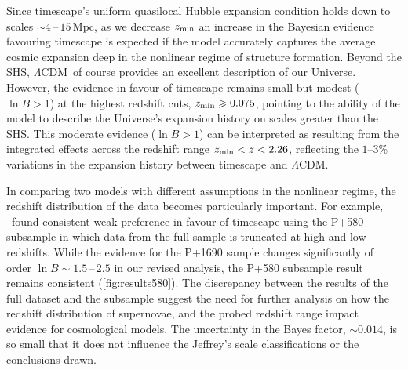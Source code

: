 \documentclass[fleqn,usenatbib]{mnras}
\newcommand{\LA}{\Lambda}
\newcommand{\LCDM}{$\LA$CDM}
\newcommand{\laneetal}{\citet{Lane_2023}}
\newcommand{\goesas}{\mathop{\sim}\limits}
\newcommand{\ns}[1]{_{\rm #1}}
\newcommand{\zmin}{z\ns{min}}
\begin{document}
Since timescape's uniform quasilocal Hubble expansion condition holds down to scales $\goesas4\,$--$\,15\,$Mpc, as we decrease $\zmin$ an increase in the Bayesian evidence favouring timescape is expected if the model accurately captures the average cosmic expansion deep in the nonlinear regime of structure formation. Beyond the SHS, \LCDM\ of course provides an excellent description of our Universe. However, the evidence in favour of timescape remains small but modest ($\ln B > 1$) at the highest redshift cuts, $\zmin \geq 0.075$, pointing to the ability of the model to describe the Universe's expansion history on scales greater than the SHS. This moderate evidence ($\ln B > 1$) can be interpreted as resulting from the integrated effects across the redshift range $\zmin<z<2.26$, reflecting the $1$--$3$\% variations in the expansion history between timescape and \LCDM.

In comparing two models with different assumptions in the nonlinear regime, the redshift distribution of the data becomes particularly important. For example, \laneetal\ found consistent weak preference in favour of timescape using the P+580 subsample in which data from the full sample is truncated at high and low redshifts. While the evidence for the P+1690 sample changes significantly of order $\ln B \sim 1.5\,$--$\,2.5$  in our revised analysis, the P+580 subsample result remains consistent (\cref{fig:results580}). The discrepancy between the results of the full dataset and the subsample suggest the need for further analysis on how the redshift distribution of supernovae, and the probed redshift range impact evidence for cosmological models. The uncertainty in the Bayes factor,  $\sim0.014$, is so small that it does not influence the Jeffrey's scale classifications or the conclusions drawn.
\end{document}
